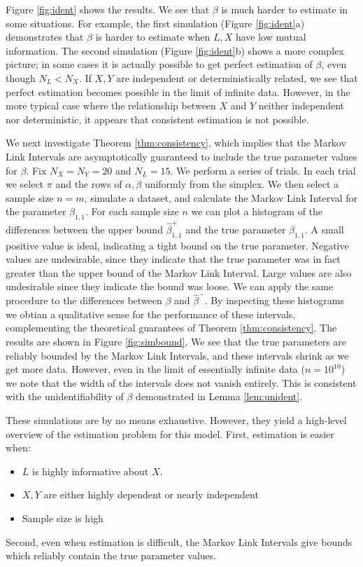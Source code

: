 \documentclass{article}
\theoremstyle{definition}
\begin{document}
Figure \ref{fig:ident} shows the results.  We see that $\beta$ is much harder to estimate in some situations.  For example, the first simulation (Figure \ref{fig:ident}a) demonstrates that $\beta$ is harder to estimate when $L,X$ have low mutual information.  The second simulation (Figure \ref{fig:ident}b) shows a more complex picture; in some cases it is actually possible to get perfect estimation of $\beta$, even though $N_L<N_X$.  If $X,Y$ are independent or deterministically related, we see that perfect estimation becomes possible in the limit of infinite data.  However, in the more typical case where the relationship between $X$ and $Y$ neither independent nor deterministic, it appears that consistent estimation is not possible.   
 
We next investigate Theorem \ref{thm:consistency}, which implies that the Markov Link Intervals are asymptotically guaranteed to include the true parameter values for $\beta$.   Fix $N_X=N_Y=20$ and $N_L=15$.  We perform a series of trials.  In each trial we select $\pi$ and the rows of $\alpha,\beta$ uniformly from the simplex.  We then select a sample size $n=m$, simulate a dataset, and calculate the Markov Link Interval for the parameter $\beta_{1,1}$.  For each sample size $n$ we can plot a histogram of the differences between the upper bound $\hat \beta^{+}_{1,1}$ and the true parameter $\beta_{1,1}$.  A small positive value is ideal, indicating a tight bound on the true parameter.  Negative values are undesirable, since they indicate that the true parameter was in fact greater than the upper bound of the Markov Link Interval.  Large values are also undesirable since they indicate the bound was loose.  We can apply the same procedure to the differences between $\beta$ and $\hat \beta^{-}$.  By inspecting these histograms we obtian a qualitative sense for the performance of these intervals, complementing the theoretical guarantees of Theorem \ref{thm:consistency}.  The results are shown in Figure \ref{fig:simbound}.  We see that the true parameters are reliably bounded by the Markov Link Intervals, and these intervals shrink as we get more data.  However, even in the limit of essentially infinite data ($n=10^{10}$) we note that the width of the intervals does not vanish entirely.  This is consistent with the unidentifiability of $\beta$ demonstrated in Lemma \ref{lem:unident}.

These simulations are by no means exhaustive.  However, they yield a high-level overview of the estimation problem for this model.  First, estimation is easier when:
\begin{itemize}
    \item $L$ is highly informative about $X$.  
    \item $X,Y$ are either highly dependent or nearly independent
    \item Sample size is high
\end{itemize}
Second, even when estimation is difficult, the Markov Link Intervals give bounds which reliably contain the true parameter values.
\end{document}
